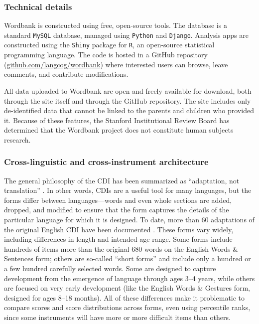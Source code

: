 \documentclass[man,noapacite]{apa}
\begin{document}
\subsubsection{Technical details}

Wordbank is constructed using free, open-source tools. The database is a standard \texttt{MySQL} database, managed using \texttt{Python} and \texttt{Django}. Analysis apps are constructed using the \texttt{Shiny} package for \texttt{R}, an open-source statistical programming language.  The code is hosted in a GitHub repository (\url{github.com/langcog/wordbank}) where interested users can browse, leave comments, and contribute modifications. 

All data uploaded to Wordbank are open and freely available for download, both through the site itself and through the GitHub repository. The site includes only de-identified data that cannot be linked to the parents and children who provided it. Because of these features, the Stanford Institutional Review Board has determined that the Wordbank project does not constitute human subjects research.

\subsubsection{Cross-linguistic and cross-instrument architecture}

The general philosophy of the CDI has been summarized as ``adaptation, not translation'' \cite{dale2015}. In other words, CDIs are a useful tool for many languages, but the forms differ between languages---words and even whole sections are added, dropped, and modified to ensure that the form captures the details of the particular language for which it is designed. To date, more than 60 adaptations of the original English CDI have been documented \cite{dale2011}. These forms vary widely, including differences in length and intended age range. Some forms include hundreds of items more than the original 680 words on the English Words \& Sentences form; others are so-called ``short forms'' and include only a hundred or a few hundred carefully selected words. Some are designed to capture development from the emergence of language through ages 3--4 years, while others are focused on very early development (like the English Words \& Gestures form, designed for ages 8--18 months). All of these differences make it problematic to compare scores and score distributions across forms, even using percentile ranks, since some instruments will have more or more difficult items than others. 
\end{document}
